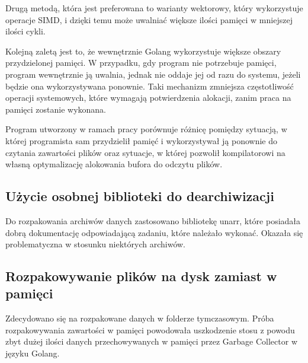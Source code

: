 Drugą metodą, która jest preferowana to warianty wektorowy, który wykorzystuje 
operacje SIMD, i dzięki temu może uwalniać większe ilości pamięci w mniejszej
ilości cykli. 

Kolejną zaletą jest to, że wewnętrznie Golang wykorzystuje większe obszary
przydzielonej pamięci. W przypadku, gdy program nie potrzebuje pamięci, program
wewnętrznie ją uwalnia, jednak nie oddaje jej od razu do systemu, jeżeli będzie 
ona wykorzystywana ponownie. Taki mechanizm zmniejsza częstotliwość operacji
systemowych, które wymagają potwierdzenia alokacji, zanim praca na pamięci 
zostanie wykonana. 

Program utworzony w ramach pracy porównuje różnicę pomiędzy sytuacją, w której
programista sam przydzielił pamięć i wykorzystywał ją ponownie do czytania 
zawartości plików oraz sytuacje, w której pozwolił kompilatorowi na własną
optymalizację alokowania bufora do odczytu plików.

\subsection{Użycie osobnej biblioteki do dearchiwizacji}

Do rozpakowania archiwów danych zastosowano bibliotekę unarr, które posiadała
dobrą dokumentację odpowiadającą zadaniu, które należało wykonać. Okazała się
problematyczna w stosunku niektórych archiwów.

\subsection{Rozpakowywanie plików na dysk zamiast w pamięci}

Zdecydowano się na rozpakowane danych w folderze tymczasowym. Próba 
rozpakowywania zawartości w pamięci powodowała uszkodzenie stosu z powodu zbyt
dużej ilości danych przechowywanych w pamięci przez Garbage Collector w języku Golang.

